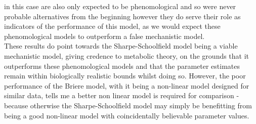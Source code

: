 \documentclass[12pt]{article}
\begin{document}
  in this case are also only expected to be phenomological
  and so were never probable alternatives from the beginning however they do serve their role as indicators of the 
  performance of this model, as we would expect these phenomological models to outperform a false mechanistic model.\\
  These results do point towards the Sharpe-Schoolfield model being a viable mechanistic model, giving credence
  to metabolic theory, on the grounds that it outperforms 
  these phenomological models and that the parameter estimates remain within biologically realistic bounds whilst doing so. 
  However, the poor performance of the Briere model, with it being a non-linear 
  model designed for similar data, tells me a better non linear model is required for comparison - because otherwise 
  the Sharpe-Schoolfield model may simply be benefitting from being a good non-linear model with coincidentally believable 
  parameter values. 


  
  
\end{document}
